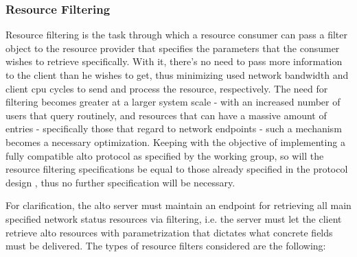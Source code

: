 \subsubsection{Resource Filtering}

    Resource filtering is the task through which a resource consumer can pass a filter object to the resource provider that specifies the parameters that the consumer wishes to retrieve specifically.
    With it, there's no need to pass more information to the client than he wishes to get, thus minimizing used network bandwidth and client \gls{cpu} cycles to send and process the resource, respectively.
    The need for filtering becomes greater at a larger system scale - with an increased number of users that query routinely, and resources that can have a massive amount of entries - specifically those that regard to network endpoints - such a mechanism becomes a necessary optimization.
    Keeping with the objective of implementing a fully compatible \gls{alto} protocol as specified by the working group, so will the resource filtering specifications be equal to those already specified in the protocol design \cite{alto-protocol}, thus no further specification will be necessary.

    For clarification, the \gls{alto} server must maintain an endpoint for retrieving all main specified network status resources via filtering, i.e. the server must let the client retrieve \gls{alto} resources with parametrization that dictates what concrete fields must be delivered.
    The types of resource filters considered are the following:

